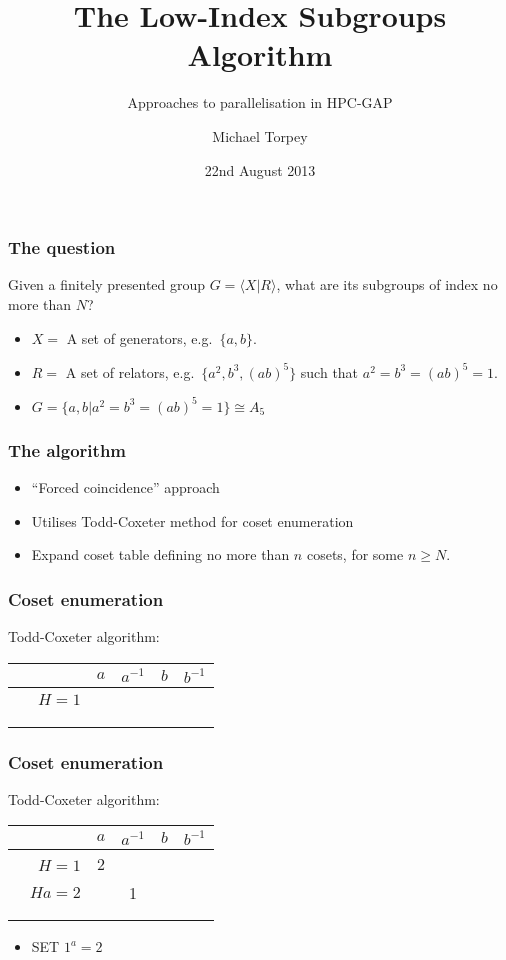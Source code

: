 \documentclass{beamer}
\title{The Low-Index Subgroups Algorithm}
\subtitle{Approaches to parallelisation in HPC-GAP}
\author{Michael Torpey}
\institute{University of St Andrews}
\date{22nd August 2013}
\begin{document}
\maketitle

\begin{frame}
  \frametitle{The question}
  Given a finitely presented group $G = \langle X | R \rangle$, what are its subgroups of index no more than $N$?
  \begin{itemize}
  \item<2-> $X = $ A set of generators, e.g.~$\{a,b\}$.
  \item<3-> $R = $ A set of relators, e.g.~$\{a^2,b^3,(ab)^5\}$ such that $a^2=b^3=(ab)^5=1$.
  \item<4-> $G = \{a,b | a^2=b^3=(ab)^5=1\} \cong A_5$
  \end{itemize}
\end{frame}

\begin{frame}
  \frametitle{The algorithm}
  \begin{itemize}
  \item ``Forced coincidence'' approach
  \item Utilises Todd-Coxeter method for coset enumeration
  \item Expand coset table defining no more than $n$ cosets, for some $n \geq N$.
  \end{itemize}
\end{frame}

\begin{frame}[t]
  \frametitle{Coset enumeration}
  \pause
  Todd-Coxeter algorithm:
  \pause
  \begin{table}
    \begin{tabular}{r | c c c c}
      & $a$ & $a^{-1}$ & $b$ & $b^{-1}$ \\ \hline
      $\phantom{b^{-1}}H=1$ & & & \phantom{3} & \\ \\ \\ \\
    \end{tabular}
  \end{table}

\end{frame}

\begin{frame}[t]
  \frametitle{Coset enumeration}
  Todd-Coxeter algorithm:
  \begin{table}
    \begin{tabular}{r | c c c c}
      & $a$ & $a^{-1}$ & $b$ & $b^{-1}$ \\ \hline
      $\phantom{b^{-1}}H=1$ & 2 & & \phantom{3} & \\
      $Ha=2$ & & 1 & & \\ \\ \\
    \end{tabular}
  \end{table}

  \begin{itemize}
  \item SET $1^a=2$
  \end{itemize}
\end{frame}
\end{document}
